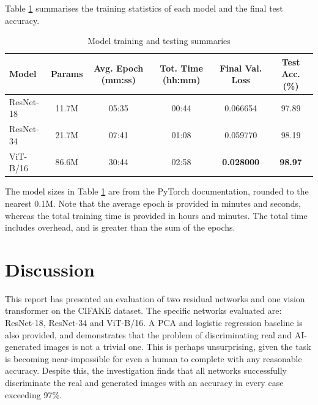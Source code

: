 \newpage

Table \ref{tab:model_results} summarises the training statistics of each model and the final test accuracy.

\begin{table}[ht]
  \centering \small {}
  \caption{Model training and testing summaries}
  \begin{tabular}{lccccc}
    \toprule
    Model & Params & Avg. Epoch (mm:ss) & Tot. Time (hh:mm) & Final Val. Loss & Test Acc. (\%) \\
    \midrule
    ResNet-18 & 11.7M & 05:35 & 00:44 & 0.066654 & 97.89 \\
    ResNet-34 & 21.7M & 07:41 & 01:08 & 0.059770 & 98.19 \\
    ViT-B/16  & 86.6M & 30:44 & 02:58 & \textbf{0.028000} & \textbf{98.97} \\
    \bottomrule
  \end{tabular}
  \label{tab:model_results}
\end{table}

The model sizes in Table \ref{tab:model_results} are from the PyTorch documentation, rounded to the nearest 0.1M. Note that the average epoch is provided in minutes and seconds, whereas the total training time is provided in hours and minutes. The total time includes overhead, and is greater than the sum of the epochs.

\section{Discussion}

This report has presented an evaluation of two residual networks and one vision transformer on the CIFAKE dataset. The specific networks evaluated are: ResNet-18, ResNet-34 and ViT-B/16. A PCA and logistic regression baseline is also provided, and demonstrates that the problem of discriminating real and AI-generated images is not a trivial one. This is perhaps unsurprising, given the task is becoming near-impossible for even a human to complete with any reasonable accuracy. Despite this, the investigation finds that all networks successfully discriminate the real and generated images with an accuracy in every case exceeding 97\%.

